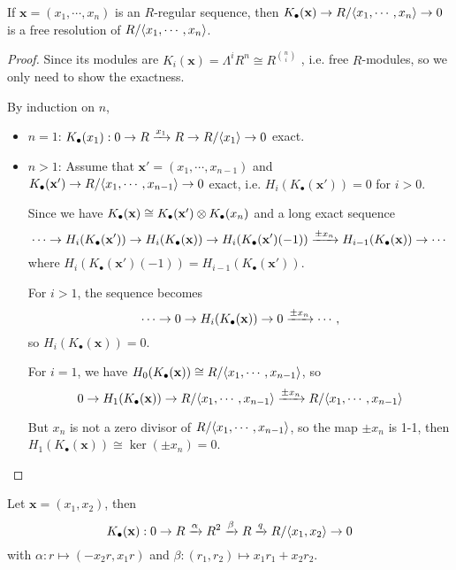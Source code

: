 \begin{theorem}
  If $\mathbf{x} = (x_1, \cdots, x_n)$ is an $R$-regular sequence, then
  $K_\bullet(\mathbf{x}) \to R/\langle x_1, \cdots, x_n\rangle \to 0$ is a free resolution of 
  $R / \langle x_1, \cdots, x_n\rangle$.

  \begin{proof}
    Since its modules are
    $K_i(\mathbf{x}) = \Lambda^i R^n \cong R^{n \choose i}$
    , i.e. free $R$-modules, so we only need to show the exactness.

    By induction on $n$, 
    \begin{itemize}
      \item $n = 1$:  
        $K_\bullet(x_1) : 0 \to R \xrightarrow{x_1} R \to R/\langle x_1\rangle \to 0$ exact.

      \item $n > 1$:  
        Assume that $\mathbf{x}' = (x_1, \cdots, x_{n-1})$ and 
        $K_\bullet(\mathbf{x}') \to R/\langle x_1, \cdots, x_{n-1}\rangle \to 0$ exact, 
        i.e. $H_i(K_\bullet(\mathbf{x}')) = 0$ for $i > 0$.

        Since we have $K_\bullet(\mathbf{x}) \cong K_\bullet(\mathbf{x}') \otimes 
        K_\bullet(x_n)$ and a long exact sequence
        $$
        \cdots \to H_i(K_\bullet(\mathbf{x}')) \to H_i(K_\bullet(\mathbf{x})) \to 
        H_i(K_\bullet(\mathbf{x}')(-1)) \xrightarrow{\pm x_n} H_{i-1}(K_\bullet(\mathbf{x})) \to \cdots
        $$
        where $H_i(K_\bullet(\mathbf{x}')(-1)) = H_{i-1}(K_\bullet(\mathbf{x}'))$.

        For $i > 1$, the sequence becomes
        $$
        \cdots \to 0 \to H_i(K_\bullet(\mathbf{x})) \to 0 \xrightarrow{\pm x_n} \cdots,
        $$
        so $H_i(K_\bullet(\mathbf{x})) = 0$. 

        For $i = 1$, we have $H_0(K_\bullet(\mathbf{x})) \cong R/\langle x_1, \cdots, x_{n-1}\rangle$, so
        $$
        0 \to H_1(K_\bullet(\mathbf{x})) \to R/\langle x_1, \cdots, x_{n-1}\rangle \xrightarrow{\pm x_n} 
        R/\langle x_1, \cdots, x_{n-1}\rangle
        $$

        But $x_n$ is not a zero divisor of $R/\langle x_1, \cdots, x_{n-1}\rangle$, so the map
        $\pm x_n$ is 1-1, then $H_1(K_\bullet(\mathbf{x})) \cong \ker (\pm x_n) = 0$. 
    \end{itemize}
  \end{proof}
\end{theorem}

\begin{example}
  Let $\mathbf{x} = (x_1, x_2)$, then
  $$
  K_\bullet(\mathbf{x}) : 0 \to R \xrightarrow{\alpha} R^2 \xrightarrow{\beta} R \xrightarrow{q} R/\langle x_1, x_2\rangle \to 0
  $$
  with $\alpha : r \mapsto (-x_2r, x_1r)$ and $\beta : (r_1, r_2) \mapsto x_1r_1 + x_2r_2$.
\end{example}

